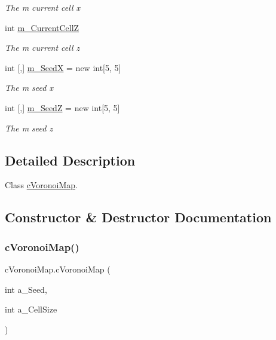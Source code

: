 \begin{DoxyCompactItemize}
\begin{DoxyCompactList}\small\item\em The m current cell x \end{DoxyCompactList}\item 
int \hyperlink{classc_voronoi_map_a8d4fa63e05ea65cec36e4a09bd2433c0}{m\+\_\+\+Current\+CellZ}
\begin{DoxyCompactList}\small\item\em The m current cell z \end{DoxyCompactList}\item 
int \mbox{[},\mbox{]} \hyperlink{classc_voronoi_map_a66f740639832ef2ac10e9031387cbd27}{m\+\_\+\+SeedX} = new int\mbox{[}5, 5\mbox{]}
\begin{DoxyCompactList}\small\item\em The m seed x \end{DoxyCompactList}\item 
int \mbox{[},\mbox{]} \hyperlink{classc_voronoi_map_afbaf9b18957ec7e155dae273f9178cf9}{m\+\_\+\+SeedZ} = new int\mbox{[}5, 5\mbox{]}
\begin{DoxyCompactList}\small\item\em The m seed z \end{DoxyCompactList}\end{DoxyCompactItemize}


\subsection{Detailed Description}
Class \hyperlink{classc_voronoi_map}{c\+Voronoi\+Map}. 



\subsection{Constructor \& Destructor Documentation}
\mbox{\label{classc_voronoi_map_a9b450ab8f0bcc1fbb80a9c9583157faf}} 
\subsubsection{\texorpdfstring{c\+Voronoi\+Map()}{cVoronoiMap()}\hspace{0.1cm}{\footnotesize\ttfamily [1/3]}}
{\footnotesize\ttfamily c\+Voronoi\+Map.\+c\+Voronoi\+Map (\begin{DoxyParamCaption}\item[{int}]{a\+\_\+\+Seed,  }\item[{int}]{a\+\_\+\+Cell\+Size }\end{DoxyParamCaption})\hspace{0.3cm}{\ttfamily [inline]}}



